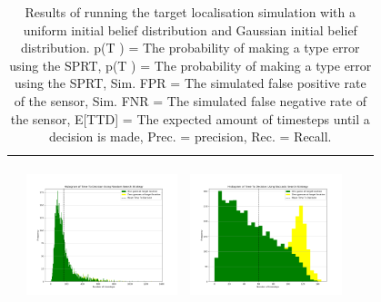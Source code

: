 \begin{landscape}
\begin{table}[h!]
\begin{tabular}{ | c | c | c | c | c |}
\begin{minipage}[c][45mm][c]{45mm}
    \end{minipage}
    &
    \begin{minipage}[c][45mm][c]{45mm}
      \includegraphics[width=44mm, height=44mm]{Chapters/MultiAgentTargetDetection/Figs/Histograms/MiscalibratedSensor/05-02/05-02RandomHistogram.png}
    \end{minipage}
    &
    \begin{minipage}[c][45mm][c]{45mm}
      \includegraphics[width=44mm, height=44mm]{Chapters/MultiAgentTargetDetection/Figs/Histograms/MiscalibratedSensor/05-02/05-02SaccadicHistogram.png}
    \end{minipage}
    \\
    \hline
   
  \end{tabular}
  \caption{Results of running the target localisation simulation with a  uniform initial belief distribution and Gaussian initial belief distribution. p(T ) = The probability of making a type  error using the SPRT, p(T ) = The probability of making a type  error using the SPRT, Sim. FPR = The simulated false positive rate of the sensor, Sim. FNR = The simulated false negative rate of the sensor, E[TTD] = The expected amount of timesteps until a decision is made, Prec. = precision, Rec. = Recall. }\label{table:ORToolsResults}
\end{table}



\end{landscape}
